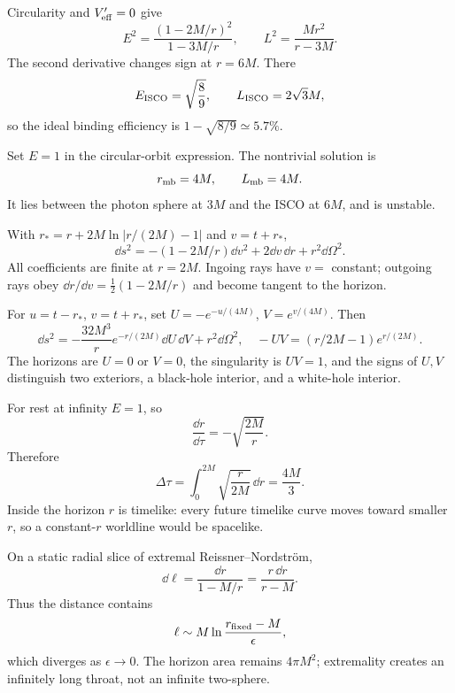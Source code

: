 \begin{solution}
Circularity and \(V_{\rm eff}'=0\) give
\[
E^2=\frac{(1-2M/r)^2}{1-3M/r},\qquad
L^2=\frac{Mr^2}{r-3M}.
\]
The second derivative changes sign at \(r=6M\).  There
\[
E_{\rm ISCO}=\sqrt{\frac89},\qquad L_{\rm ISCO}=2\sqrt3M,
\]
so the ideal binding efficiency is \(1-\sqrt{8/9}\simeq5.7\%\).
\end{solution}

\begin{solution}
Set \(E=1\) in the circular-orbit expression.  The nontrivial solution is
\[
r_{\rm mb}=4M,\qquad L_{\rm mb}=4M.
\]
It lies between the photon sphere at \(3M\) and the ISCO at \(6M\), and is
unstable.
\end{solution}

\begin{solution}
With
\(r_\ast=r+2M\ln|r/(2M)-1|\) and \(v=t+r_\ast\),
\[
\dd s^2=-(1-2M/r)\dd v^2+2\dd v\,\dd r+r^2\dd\Omega^2.
\]
All coefficients are finite at \(r=2M\).  Ingoing rays have \(v=\) constant;
outgoing rays obey \(\dd r/\dd v=\tfrac12(1-2M/r)\) and become tangent to the
horizon.
\end{solution}

\begin{solution}
For \(u=t-r_\ast\), \(v=t+r_\ast\), set
\(U=-e^{-u/(4M)}\), \(V=e^{v/(4M)}\).  Then
\[
\dd s^2=-\frac{32M^3}{r}e^{-r/(2M)}\dd U\,\dd V+r^2\dd\Omega^2,
\quad
-UV=(r/2M-1)e^{r/(2M)}.
\]
The horizons are \(U=0\) or \(V=0\), the singularity is \(UV=1\), and the
signs of \(U,V\) distinguish two exteriors, a black-hole interior, and a
white-hole interior.
\end{solution}

\begin{solution}
For rest at infinity \(E=1\), so
\[
\frac{\dd r}{\dd\tau}=-\sqrt{\frac{2M}{r}}.
\]
Therefore
\[
\Delta\tau=\int_0^{2M}\sqrt{\frac{r}{2M}}\,\dd r=\frac{4M}{3}.
\]
Inside the horizon \(r\) is timelike: every future timelike curve moves
toward smaller \(r\), so a constant-\(r\) worldline would be spacelike.
\end{solution}

\begin{solution}
On a static radial slice of extremal Reissner--Nordstr\"om,
\[
\dd\ell=\frac{\dd r}{1-M/r}=\frac{r\,\dd r}{r-M}.
\]
Thus the distance contains
\[
\ell\sim M\ln\frac{r_{\rm fixed}-M}{\epsilon},
\]
which diverges as \(\epsilon\to0\).  The horizon area remains
\(4\pi M^2\); extremality creates an infinitely long throat, not an infinite
two-sphere.
\end{solution}

